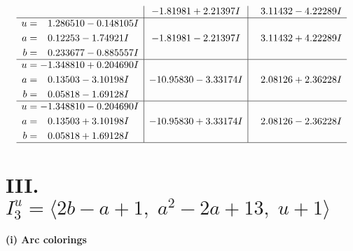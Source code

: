 \documentclass[1p]{elsarticle_modified}
\theoremstyle{definition}
\begin{document}
$$\begin{array}{c|c|c}
 & -1.81981 + 2.21397 I & \phantom{-}3.11432 - 4.22289 I \\ \hline\begin{aligned}
u &= \phantom{-}1.286510 - 0.148105 I \\
a &= \phantom{-}0.12253 - 1.74921 I \\
b &= \phantom{-}0.233677 - 0.885557 I\end{aligned}
 & -1.81981 - 2.21397 I & \phantom{-}3.11432 + 4.22289 I \\ \hline\begin{aligned}
u &= -1.348810 + 0.204690 I \\
a &= \phantom{-}0.13503 - 3.10198 I \\
b &= \phantom{-}0.05818 - 1.69128 I\end{aligned}
 & -10.95830 - 3.33174 I & \phantom{-}2.08126 + 2.36228 I \\ \hline\begin{aligned}
u &= -1.348810 - 0.204690 I \\
a &= \phantom{-}0.13503 + 3.10198 I \\
b &= \phantom{-}0.05818 + 1.69128 I\end{aligned}
 & -10.95830 + 3.33174 I & \phantom{-}2.08126 - 2.36228 I\\
 \hline 
 \end{array}$$\newpage\newpage\renewcommand{\arraystretch}{1}
\centering \section*{III. $I^u_{3}= \langle 2 b- a+1,\;a^2-2 a+13,\;u+1 \rangle$}
\flushleft \textbf{(i) Arc colorings}\\
\end{document}
